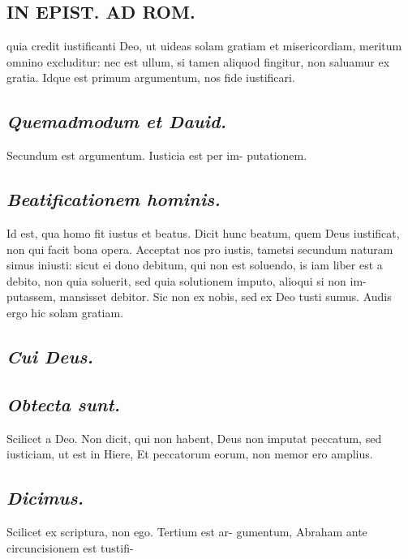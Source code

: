 \documentclass{article}
\begin{document}
\begin{pages}
\section*{IN EPIST. AD ROM.  }
\marginpar{[ p.39 ]}\pstart quia credit iustificanti Deo, ut uideas solam gratiam et misericordiam, meritum omnino excluditur: nec est ullum, si tamen aliquod fingitur, non saluamur ex gratia. Idque est primum argumentum, nos fide iustificari.  \pend
{}
{}
\subsection*{\textit{Quemadmodum et Dauid. }}\pstart Secundum est argumentum. Iusticia est per im- putationem.   \pend
{}
{}
\subsection*{\textit{Beatificationem hominis. }}\pstart Id est, qua homo fit iustus et beatus.   \pend\pstart Dicit hunc beatum, quem Deus iustificat, non qui facit bona opera. Acceptat nos pro iustis, tametsi secundum naturam simus iniusti: sicut ei dono debitum, qui non est soluendo, is iam liber est a debito, non quia soluerit, sed quia solutionem imputo, alioqui si non im- putassem, mansisset debitor. Sic non ex nobis, sed ex Deo tusti sumus. Audis ergo hic solam gratiam.   \pend
{}
{}
\subsection*{\textit{Cui Deus. }}
{}
\subsection*{\textit{Obtecta sunt. }}\pstart Scilicet a Deo. Non dicit, qui non habent, Deus non imputat peccatum, sed iusticiam, ut est in Hiere, Et peccatorum eorum, non memor ero amplius.   \pend
{}
{}
\subsection*{\textit{Dicimus. }}\pstart Scilicet ex scriptura, non ego. Tertium est ar- gumentum, Abraham ante circuncisionem est tustifi-  \pend

\end{pages}
\end{document}
